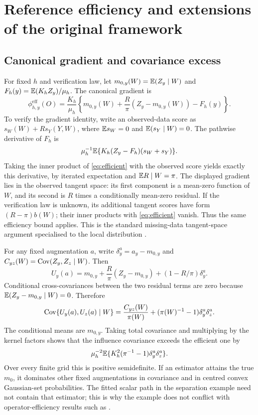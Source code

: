 \section{Reference efficiency and extensions of the original framework}
\subsection{Canonical gradient and covariance excess}
For fixed $h$ and verification law, let $m_{0,y}(W)=\mathbb E(Z_y\mid W)$ and $F_h(y)=\mathbb E(K_hZ_y)/\mu_h$. The canonical gradient is
\begin{equation}\label{eq:efficient}
 \phi^{\mathrm{eff}}_{h,y}(O)=\frac{K_h}{\mu_h}
 \left\{m_{0,y}(W)+\frac R\pi(Z_y-m_{0,y}(W))-F_h(y)\right\}.
\end{equation}
To verify the gradient identity, write an observed-data score as $s_W(W)+Rs_Y(Y,W)$, where $\mathbb E s_W=0$ and $\mathbb E(s_Y\mid W)=0$. The pathwise derivative of $F_h$ is
\[
 \mu_h^{-1}\mathbb E\{K_h(Z_y-F_h)(s_W+s_Y)\}.
\]
Taking the inner product of \eqref{eq:efficient} with the observed score yields exactly this derivative, by iterated expectation and $\mathbb E R\mid W=\pi$. The displayed gradient lies in the observed tangent space: its first component is a mean-zero function of $W$, and its second is $R$ times a conditionally mean-zero residual. If the verification law is unknown, its additional tangent scores have form $(R-\pi)b(W)$; their inner products with \eqref{eq:efficient} vanish. Thus the same efficiency bound applies. This is the standard missing-data tangent-space argument specialised to the local distribution \citep{Tsiatis2006,RobinsRotnitzkyZhao1994}.

For any fixed augmentation $a$, write $\delta_y^a=a_y-m_{0,y}$ and $C_{yz}(W)=\operatorname{Cov}(Z_y,Z_z\mid W)$. Then
\[
 U_y(a)=m_{0,y}+\frac R\pi(Z_y-m_{0,y})+(1-R/\pi)\delta_y^a.
\]
Conditional cross-covariances between the two residual terms are zero because $\mathbb E(Z_y-m_{0,y}\mid W)=0$. Therefore
\begin{equation}
 \operatorname{Cov}\{U_y(a),U_z(a)\mid W\}
 =\frac{C_{yz}(W)}{\pi(W)}+(\pi(W)^{-1}-1)\delta_y^a\delta_z^a.
\end{equation}
The conditional means are $m_{0,y}$. Taking total covariance and multiplying by the kernel factors shows that the influence covariance exceeds the efficient one by
\begin{equation}\label{eq:excess}
 \mu_h^{-2}\mathbb E\{K_h^2(\pi^{-1}-1)\delta_y^a\delta_z^a\}.
\end{equation}
Over every finite grid this is positive semidefinite. If an estimator attains the true $m_0$, it dominates other fixed augmentations in covariance and in centred convex Gaussian-set probabilities. The fitted scalar path in the separation example need not contain that estimator; this is why the example does not conflict with operator-efficiency results such as \citet{zhang2026generation}.

